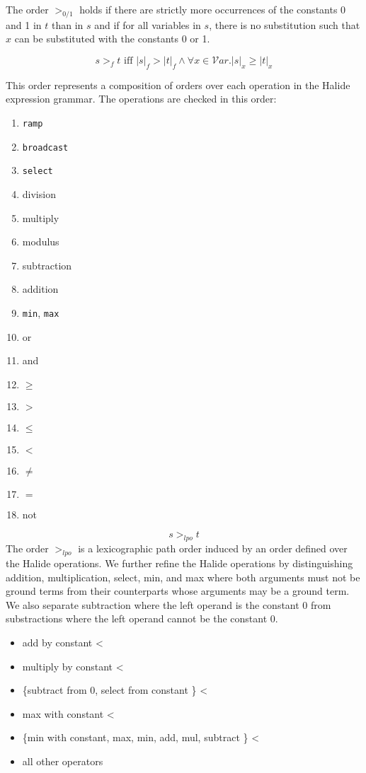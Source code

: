 \documentclass[acmsmall,review,anonymous]{acmart}\settopmatter{printfolios=true,printccs=false,printacmref=false}
\begin{document}
The order $>_{0/1}$ holds if there are strictly more occurrences of the constants 0 and 1 in $t$ than in $s$ and if for all variables in $s$, there is no substitution such that $x$ can be substituted with the constants 0 or 1.

\begin{equation}
s >_{f} t \textrm{ iff } |s|_{f} > |t|_{f} \wedge \forall x \in \mathcal{V}ar . |s|_x \geq |t|_x
\end{equation} 

This order represents a composition of orders over each operation in the Halide expression grammar. The operations are checked in this order:

\begin{enumerate}
  \item \texttt{ramp}
  \item \texttt{broadcast}
  \item \texttt{select}
  \item division
  \item multiply
  \item modulus
  \item subtraction
  \item addition
  \item \texttt{min}, \texttt{max}
  \item or
  \item and
  \item $\geq$
  \item $>$
  \item $\leq$
  \item $<$
  \item $\neq$
  \item $=$
  \item not
\end{enumerate}

\begin{equation}
s >_{lpo} t
\end{equation}
The order $>_{lpo}$ is a lexicographic path order induced by an order defined over the Halide operations. We further refine the Halide operations by distinguishing addition, multiplication, select, min, and max where both arguments must not be ground terms from their counterparts whose arguments may be a ground term. We also separate subtraction where the left operand is the constant 0 from substractions where the left operand cannot be the constant 0.

\begin{itemize}
  \item add by constant <
  \item multiply by constant <
  \item \{subtract from 0, select from constant \} < 
  \item max with constant <
  \item \{min with constant, max, min, add, mul, subtract \} <
  \item all other operators
\end{itemize}
\end{document}

